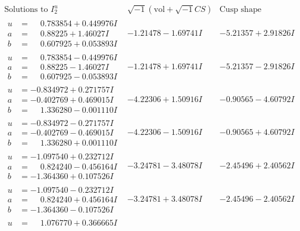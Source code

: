 \documentclass[1p]{elsarticle_modified}
\theoremstyle{definition}
\newcommand{\I}{\sqrt{-1}}
\begin{document}
$$\begin{array}{c|c|c}  
\text{Solutions to }I^u_{2}& \I (\text{vol} + \sqrt{-1}CS) & \text{Cusp shape}\\
 \hline 
\begin{aligned}
u &= \phantom{-}0.783854 + 0.449976 I \\
a &= \phantom{-}0.88225 + 1.46027 I \\
b &= \phantom{-}0.607925 + 0.053893 I\end{aligned}
 & -1.21478 - 1.69741 I & -5.21357 + 2.91826 I \\ \hline\begin{aligned}
u &= \phantom{-}0.783854 - 0.449976 I \\
a &= \phantom{-}0.88225 - 1.46027 I \\
b &= \phantom{-}0.607925 - 0.053893 I\end{aligned}
 & -1.21478 + 1.69741 I & -5.21357 - 2.91826 I \\ \hline\begin{aligned}
u &= -0.834972 + 0.271757 I \\
a &= -0.402769 + 0.469015 I \\
b &= \phantom{-}1.336280 - 0.001110 I\end{aligned}
 & -4.22306 + 1.50916 I & -0.90565 - 4.60792 I \\ \hline\begin{aligned}
u &= -0.834972 - 0.271757 I \\
a &= -0.402769 - 0.469015 I \\
b &= \phantom{-}1.336280 + 0.001110 I\end{aligned}
 & -4.22306 - 1.50916 I & -0.90565 + 4.60792 I \\ \hline\begin{aligned}
u &= -1.097540 + 0.232712 I \\
a &= \phantom{-}0.824240 - 0.456164 I \\
b &= -1.364360 + 0.107526 I\end{aligned}
 & -3.24781 - 3.48078 I & -2.45496 + 2.40562 I \\ \hline\begin{aligned}
u &= -1.097540 - 0.232712 I \\
a &= \phantom{-}0.824240 + 0.456164 I \\
b &= -1.364360 - 0.107526 I\end{aligned}
 & -3.24781 + 3.48078 I & -2.45496 - 2.40562 I \\ \hline\begin{aligned}
u &= \phantom{-}1.076770 + 0.366665 I \\

\end{aligned}
\end{array}$$
\end{document}
